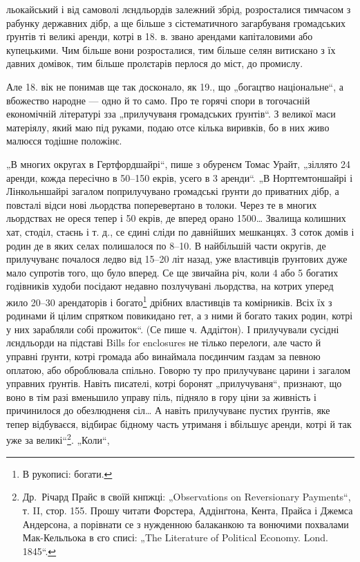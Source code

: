 \parcont{}
льокайський і від самоволі лєндльордів залежний збрід, розросталися тимчасом з рабунку державних
дібр, а ще більше з сістематичного загарбуваня громадських ґрунтів ті великі аренди, котрі в 18. в.
звано арендами капіталовими або купецькими. Чим більше вони розросталися, тим більше селян витискано
з їх давних домівок, тим більше пролєтарів перлося до міст, до промислу.

Але 18. вік не понимав ще так досконало, як 19., що „богацтво національне“, а вбожество народне —
одно й то само. Про те горячі спори в тогочасній економічній літературі зза „прилучуваня громадських
ґрунтів“. З великої
маси матеріялу, який маю під руками, подаю отсе кілька виривків, бо в них живо малюєся тодішне
положінє.

„В многих округах в Гертфордшайрі“, пише з обуренєм Томас Урайт, „зіллято 24 аренди, кожда пересічно
в 50--150 екрів, усего в 3 аренди“. „В Нортгемтоншайрі і Лінкольншайрі загалом поприлучувано
громадські ґрунти до приватних дібр, а повсталі відси нові льордства поперевертано в толоки. Через
те в многих льордствах не ореся тепер і 50 екрів, де вперед орано 1500\dots{} Звалища колишних хат,
стоділ, стаєнь і т. д., се єдині сліди по давнійших мешканцях. З соток домів і родин де в яких селах
полишалося по 8--10. В найбільшій части округів, де прилучуванє почалося ледво від 15--20 літ назад,
уже властивців ґрунтових дуже мало супротів того, що було вперед. Се ще звичайна річ, коли 4 або 5
богатих годівників худоби посідают недавно позлучувані льордства, на котрих уперед жило 20--30
арендаторів і богато\footnote*{
В рукописі: богати.
} дрібних властивців та комірників. Всіх їх з родинами й цілим спрятком
повикидано гет, а з ними й богато таких родин, котрі у них зарабляли собі прожиток“. (Се пише ч.
Аддіґтон). І прилучували сусідні лєндльорди на підставі Bills for enclosures не тілько перелоги, але
часто й управні ґрунти, котрі громада або винаймала поєдинчим ґаздам за певною оплатою, або
оброблювала спільно. Говорю ту про прилучуванє царини
і загалом управних ґрунтів. Навіть писателі, котрі боронят „прилучуваня“, признают, що воно в тім
разі вменьшило управу піль, підняло в гору ціни за живність і причинилося до обезлюдненя сіл\dots{} А
навіть прилучуванє пустих ґрунтів, яке тепер відбуваєся, відбирає бідному часть утриманя
і вбільшує аренди, котрі й так уже за великі“\footnote{
Др.~Річард Прайс в своїй кнпжці: „Observations on Reversionary
Payments“, т. II, стор. 155. Прошу читати Форстера, Аддінґтона, Кента,
Прайса і Джемса Андерсона, а порівнати се з нужденною балаканкою
та вонючими похвалами Мак-Кельльока в єго списі: „The Literature of
Political Economy. Lond. 1845“.
}. „Коли“,
\parbreak{}
